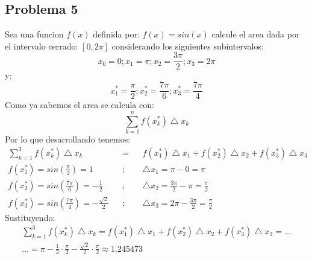 \documentclass{article}
\begin{document}
      \subsection{Problema 5}
      Sea una funcion \(f(x)\) definida por: \(f(x) = sin(x)\) calcule el area dada por el intervalo cerrado: \([0,2\pi]\) considerando los siguientes subintervalos: $$x_0 = 0; x_1 = \pi; x_2 = \frac{3\pi}{2}; x_3 = 2\pi$$ y: $$x_1^*=\frac{\pi}{2}; x_2^*=\frac{7\pi}{6}; x_3^* = \frac{7\pi}{4}$$
      Como ya sabemos el area se calcula con: $$\sum_{k=1}^{n}f(x^*_k) \bigtriangleup  x_k$$
      Por lo que desarrollando tenemos:
      \begin{align*}
        \sum_{k=1}^{3}f(x^*_k) \bigtriangleup  x_k && = && f(x_1^*)\bigtriangleup x_1 + f(x_2^*)\bigtriangleup x_2 + f(x_3^*)\bigtriangleup x_3 \\
        f(x_1^*) = sin\left(\frac{\pi}{2}\right) = 1 && ; && \bigtriangleup x_1 = \pi - 0 = \pi  \\
        f(x_2^*) = sin\left(\frac{7\pi}{6}\right) = -\frac{1}{2} && ; && \bigtriangleup x_2 = \frac{3\pi}{2} - \pi = \frac{\pi}{2} \\ 
        f(x_3^*) = sin\left(\frac{7\pi}{4}\right) = -\frac{\sqrt{2}}{2} && ; && \bigtriangleup x_3 = 2\pi - \frac{3\pi}{2}  = \frac{\pi}{2}
      \end{align*}
      Sustituyendo:
      \begin{align*}
        \sum_{k=1}^{3}f(x^*_k) \bigtriangleup  x_k = f(x_1^*)\bigtriangleup x_1 + f(x_2^*)\bigtriangleup x_2 + f(x_3^*)\bigtriangleup x_3 = \dots \\ \dots = \pi - \frac{1}{2} \cdot \frac{\pi}{2} - \frac{\sqrt{2}}{2} \cdot \frac{\pi}{2} \approx 1.245473
      \end{align*}
\end{document}
